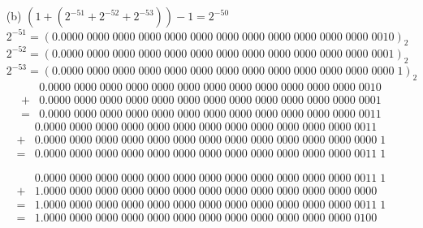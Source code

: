 \documentclass[UTF8]{ctexart}
\begin{document}
\begin{enumerate}
\begin{itemize}
\item[(b)] $(1 + (2^{-51} + 2^{-52} + 2^{-53})) - 1 = 2^{-50}$ \\
$2^{-51} = (0.0000\;0000\;0000\;0000\;0000\;0000\;0000\;0000\;0000\;0000\;0000\;0000\;0010)_2$ \\
$2^{-52} = (0.0000\;0000\;0000\;0000\;0000\;0000\;0000\;0000\;0000\;0000\;0000\;0000\;0001)_2$ \\
$2^{-53} = (0.0000\;0000\;0000\;0000\;0000\;0000\;0000\;0000\;0000\;0000\;0000\;0000\;0000\;1)_2$ \\
\begin{align*}
 &0.0000\;0000\;0000\;0000\;0000\;0000\;0000\;0000\;0000\;0000\;0000\;0000\;0010 \\
+&0.0000\;0000\;0000\;0000\;0000\;0000\;0000\;0000\;0000\;0000\;0000\;0000\;0001 \\
\hline
=&0.0000\;0000\;0000\;0000\;0000\;0000\;0000\;0000\;0000\;0000\;0000\;0000\;0011 
\end{align*}
\begin{align*}
 &0.0000\;0000\;0000\;0000\;0000\;0000\;0000\;0000\;0000\;0000\;0000\;0000\;0011 \\
+&0.0000\;0000\;0000\;0000\;0000\;0000\;0000\;0000\;0000\;0000\;0000\;0000\;0000\;1 \\
\hline
=&0.0000\;0000\;0000\;0000\;0000\;0000\;0000\;0000\;0000\;0000\;0000\;0000\;0011\;1 
\end{align*}

\begin{align*}
 &0.0000\;0000\;0000\;0000\;0000\;0000\;0000\;0000\;0000\;0000\;0000\;0000\;0011\;1 \\
+&1.0000\;0000\;0000\;0000\;0000\;0000\;0000\;0000\;0000\;0000\;0000\;0000\;0000 \\
\hline
=&1.0000\;0000\;0000\;0000\;0000\;0000\;0000\;0000\;0000\;0000\;0000\;0000\;0011\;1 \\
=&1.0000\;0000\;0000\;0000\;0000\;0000\;0000\;0000\;0000\;0000\;0000\;0000\;0100 \\
\end{align*}

\end{itemize}


\end{enumerate}
\end{document}
